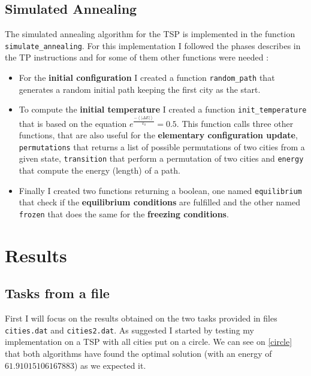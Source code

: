 \documentclass[14pt]
{article}
\begin{document}
\subsection{Simulated Annealing}
The simulated annealing algorithm for the TSP is implemented in the function \texttt{simulate\_annealing}. For this implementation I followed the phases describes in the TP instructions and for some of them other functions were needed :
\begin{itemize}
\item For the \textbf{initial configuration} I created a function \texttt{random\_path} that generates a random initial path keeping the first city as the start.

\item To compute the \textbf{initial temperature} I created a function \texttt{init\_temperature} that is based on the equation $e^{\frac{-\left\langle \vert \Delta E\vert\right\rangle}{T_{0}}} = 0.5$. This function calls three other functions, that are also useful for the \textbf{elementary configuration update}, \texttt{permutations} that returns a list of possible permutations of two cities from a given state, \texttt{transition} that perform a permutation of two cities and \texttt{energy} that compute the energy (length) of a path.

\item Finally I created two functions returning a boolean, one named \texttt{equilibrium} that check if the \textbf{equilibrium conditions} are fulfilled and the other named \texttt{frozen} that does the same for the \textbf{freezing conditions}.

\end{itemize}

\section{Results}

\subsection{Tasks from a file}
First I will focus on the results obtained on the two tasks provided in files \texttt{cities.dat} and \texttt{cities2.dat}. As suggested I started by testing my implementation on a TSP with all cities put on a circle. We can see on \autoref{circle} that both algorithms have found the optimal solution (with an energy of $61.91015106167883$) as we expected it.
\end{document}
